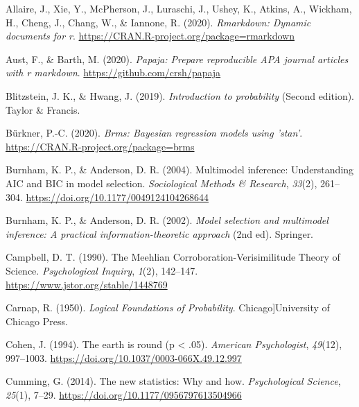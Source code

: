 \documentclass[
  a4paper,11pt,twoside,onecolumn,openright,final,oldfontcommands]{memoir}
\newlength{\cslhangindent}
\newlength{\cslentryspacingunit} %
\newenvironment{CSLReferences}[2] %
 {%
  \setlength{\parindent}{0pt}
  \ifodd #1
  \let\oldpar\par
  \def\par{\hangindent=\cslhangindent\oldpar}
  \fi
  \setlength{\parskip}{#2\cslentryspacingunit}
 }%
 {}
\theoremstyle{definition}
\theoremstyle{definition}
\theoremstyle{definition}
\theoremstyle{definition}
\theoremstyle{remark}
\begin{document}
\hypertarget{refs}{}
\begin{CSLReferences}{1}{0}
\leavevmode{}%
Allaire, J., Xie, Y., McPherson, J., Luraschi, J., Ushey, K., Atkins, A., Wickham, H., Cheng, J., Chang, W., \& Iannone, R. (2020). \emph{Rmarkdown: Dynamic documents for r}. \url{https://CRAN.R-project.org/package=rmarkdown}

\leavevmode{}%
Aust, F., \& Barth, M. (2020). \emph{Papaja: Prepare reproducible APA journal articles with r markdown}. \url{https://github.com/crsh/papaja}

\leavevmode{}%
Blitzstein, J. K., \& Hwang, J. (2019). \emph{Introduction to probability} (Second edition). Taylor \& Francis.

\leavevmode{}%
Bürkner, P.-C. (2020). \emph{Brms: Bayesian regression models using 'stan'}. \url{https://CRAN.R-project.org/package=brms}

\leavevmode{}%
Burnham, K. P., \& Anderson, D. R. (2004). Multimodel inference: {Understanding} {AIC} and {BIC} in model selection. \emph{Sociological Methods \& Research}, \emph{33}(2), 261--304. \url{https://doi.org/10.1177/0049124104268644}

\leavevmode{}%
Burnham, K. P., \& Anderson, D. R. (2002). \emph{Model selection and multimodel inference: A practical information-theoretic approach} (2nd ed). Springer.

\leavevmode{}%
Campbell, D. T. (1990). The {Meehlian} {Corroboration}-{Verisimilitude} {Theory} of {Science}. \emph{Psychological Inquiry}, \emph{1}(2), 142--147. \url{https://www.jstor.org/stable/1448769}

\leavevmode{}%
Carnap, R. (1950). \emph{Logical {Foundations} of {Probability}}. Chicago{]}University of Chicago Press.

\leavevmode{}%
Cohen, J. (1994). The earth is round (p {\textless{}} .05). \emph{American Psychologist}, \emph{49}(12), 997--1003. \url{https://doi.org/10.1037/0003-066X.49.12.997}

\leavevmode{}%
Cumming, G. (2014). The new statistics: {Why} and how. \emph{Psychological Science}, \emph{25}(1), 7--29. \url{https://doi.org/10.1177/0956797613504966}


\end{CSLReferences}
\end{document}

